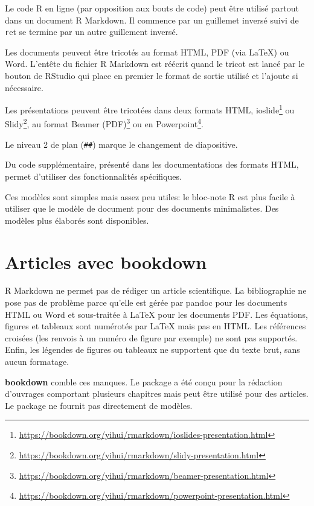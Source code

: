 \documentclass[
  12pt,
  french,
  a4paper,
  extrafontsizes,onecolumn,openright
  ]{memoir}
\begin{document}
Le code R en ligne (par opposition aux bouts de code) peut être utilisé partout dans un document R Markdown.
Il commence par un guillemet inversé suivi de \texttt{r}et se termine par un autre guillement inversé.

Les documents peuvent être tricotés au format HTML, PDF (via LaTeX) ou Word.
L'entête du fichier R Markdown est réécrit quand le tricot est lancé par le bouton de RStudio qui place en premier le format de sortie utilisé et l'ajoute si nécessaire.

Les présentations peuvent être tricotées dans deux formats HTML, ioslide\footnote{\url{https://bookdown.org/yihui/rmarkdown/ioslides-presentation.html}} ou Slidy\footnote{\url{https://bookdown.org/yihui/rmarkdown/slidy-presentation.html}}, au format Beamer (PDF)\footnote{\url{https://bookdown.org/yihui/rmarkdown/beamer-presentation.html}} ou en Powerpoint\footnote{\url{https://bookdown.org/yihui/rmarkdown/powerpoint-presentation.html}}.

Le niveau 2 de plan (\texttt{\#\#}) marque le changement de diapositive.

Du code supplémentaire, présenté dans les documentations des formats HTML, permet d'utiliser des fonctionnalités spécifiques.

Ces modèles sont simples mais assez peu utiles: le bloc-note R est plus facile à utiliser que le modèle de document pour des documents minimalistes.
Des modèles plus élaborés sont disponibles.

\hypertarget{articles-avec-bookdown}{%
\section{Articles avec bookdown}\label{articles-avec-bookdown}}

R Markdown ne permet pas de rédiger un article scientifique.
La bibliographie ne pose pas de problème parce qu'elle est gérée par pandoc pour les documents HTML ou Word et sous-traitée à LaTeX pour les documents PDF.
Les équations, figures et tableaux sont numérotés par LaTeX mais pas en HTML.
Les références croisées (les renvois à un numéro de figure par exemple) ne sont pas supportés.
Enfin, les légendes de figures ou tableaux ne supportent que du texte brut, sans aucun formatage.

\textbf{bookdown} comble ces manques.
Le package a été conçu pour la rédaction d'ouvrages comportant plusieurs chapitres mais peut être utilisé pour des articles.
Le package ne fournit pas directement de modèles.
\end{document}
